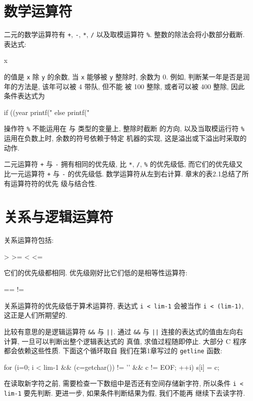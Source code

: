 \section{数学运算符}
二元的数学运算符有 \verb"+", \verb"-", \verb"*", \verb"/" 以及取模运算符
\verb"%". 整数的除法会将小数部分截断. 表达式:
\begin{myverbatim}
    x %
\end{myverbatim}
的值是 \verb"x" 除 \verb"y" 的余数, 当 \verb"x" 能够被 \verb"y" 整除时,
余数为 0. 例如, 判断某一年是否是润年的方法是, 该年可以被 4 带队, 但不能
被 100 整除, 或者可以被 400 整除, 因此条件表达式为
\begin{myverbatim}
    if ((year %
        printf("%
    else 
        printf("%
\end{myverbatim}
操作符 \verb"%" 不能运用在 \cfloat 与 \cdouble 类型的变量上, 整除时截断
的方向, 以及当取模运行符 \verb"%" 运用在负数上时, 余数的符号依赖于特定
机器的实现, 这是溢出或下溢出时采取的动作.

二元运算符 \verb"+" 与 \verb"-" 拥有相同的优先级, 比 \verb"*", \verb"/",
\verb"%" 的优先级低, 而它们的优先级又比一元运算符 \verb"+" 与 \verb"-"
的优先级低. 数学运算符从左到右计算. 章末的表2.1总结了所有运算符符的优先
级与结合性.

\section{关系与逻辑运算符}
关系运算符包括:
\begin{myverbatim}
    >  >=  <  <=
\end{myverbatim}
它们的优先级都相同. 优先级刚好比它们低的是相等性运算符:
\begin{myverbatim}
    ==  !=
\end{myverbatim}
关系运算符的优先级低于算术运算符, 表达式 \verb"i < lim-1" 会被当作 
\verb"i < (lim-1)", 这正是人们所期望的.

比较有意思的是逻辑运算符 \verb"&&" 与 \verb"||". 通过 \verb"&&" 与
\verb"||" 连接的表达式的值由左向右计算, 一旦可以判断出整个逻辑表达式的
真值, 求值过程随即停止. 大部分 C 程序都会依赖这些性质. 下面这个循环取自
我们在第1章写过的 \verb"getline" 函数:
\begin{myverbatim}
    for (i=0; i < lim-1 && (c=getchar()) != '\n' && c != EOF; ++i)
        s[i] = c;
\end{myverbatim}
在读取新字符之前, 需要检查一下数组中是否还有空间存储新字符, 所以条件
\verb"i < lim-1" 要先判断. 更进一步, 如果条件判断结果为假, 我们不能再
继续下去读字符.

